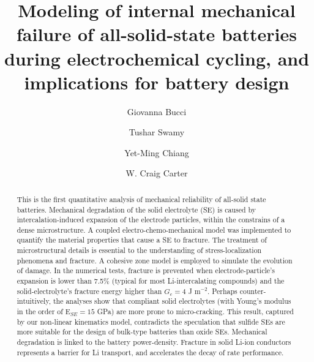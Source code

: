\documentclass[final,5p,sort&compress]{elsarticle}
\begin{document}
\begin{frontmatter}

\title{Modeling of internal mechanical failure of all-solid-state batteries during electrochemical cycling, and implications for battery design}

\author[mymainaddress]{Giovanna Bucci
}

\author[mymainaddress]{Tushar Swamy}
\author[mymainaddress]{Yet-Ming Chiang}
\author[mymainaddress]{W. Craig Carter}

\address[mymainaddress]{Massachusetts Institute of Technology, Department of Materials Science and Engineering -
77 Massachusetts Avenue, Cambridge, MA 02139-4307 USA}


\begin{abstract}
This is the first quantitative analysis of
mechanical reliability of all-solid state batteries.
%
Mechanical degradation of the solid electrolyte (SE) is caused by intercalation-induced expansion of the electrode particles, within the constrains of a dense microstructure.
%
A coupled electro-chemo-mechanical model was implemented to quantify the material properties that cause a SE to fracture.
%
The treatment of microstructural details 
is essential to the understanding of stress-localization phenomena and fracture.
A cohesive zone model is employed to simulate the evolution of damage.
%
In the numerical tests, fracture is prevented when
electrode-particle's expansion is lower than 7.5\% 
(typical for most Li-intercalating compounds)
and the solid-electrolyte's fracture energy higher than $G_c = 4$ J m$^{-2}$. 
%
Perhaps counter-intuitively, the analyses show that 
compliant solid electrolytes (with Young's modulus in the order of E$_{SE} = 15$ GPa) are more prone to micro-cracking. 
This result, 
captured by our non-linear kinematics model, 
contradicts
the speculation that sulfide SEs are more suitable
for the design of bulk-type batteries than oxide SEs.
%
Mechanical degradation is linked to the battery power-density. Fracture in solid Li-ion conductors represents a barrier for Li transport, and accelerates the decay of rate performance.
\end{abstract}

\end{frontmatter}


\end{document}
